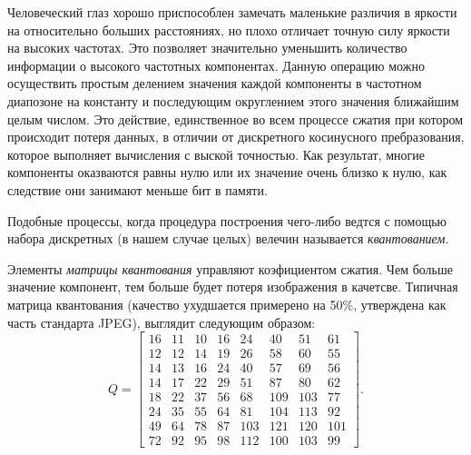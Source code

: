 \documentclass{matmex-diploma-custom}
\begin{document}
Человеческий глаз  хорошо приспособлен замечать маленькие различия в яркости на относительно больших расстояниях, но плохо отличает точную силу яркости на высоких частотах. Это позволяет значительно уменьшить количество информации о высокого частотных компонентах. Данную операцию можно  осуществить простым делением значения  каждой компоненты в частотном диапозоне на константу и последующим округлением этого значения ближайшим целым числом. Это действие, единственное во всем процессе сжатия при котором происходит потеря данных, в отличии от дискретного косинусного пребразования, которое выполняет вычисления с выской точностью. Как результат, многие компоненты оказваются равны  нулю или их значение очень близко к нулю, как следствие они занимают меньше бит в памяти.

Подобные процессы, когда процедура построения чего-либо ведтся с помощью набора дискретных (в нашем случае целых) велечин называется \emph{квантованием}.

Элементы \emph{матрицы квантования} управляют коэфициентом сжатия. Чем больше значение компонент, тем больше будет потеря изображения в качетсве. Типичная матрица квантования (качество ухудшается примерено на 50\%, утверждена как часть стандарта JPEG), выглядит следующим образом:
$$ Q=
     \begin{bmatrix}
      16 & 11 & 10 & 16 & 24 & 40 & 51 & 61 \\
      12 & 12 & 14 & 19 & 26 & 58 & 60 & 55 \\
      14 & 13 & 16 & 24 & 40 & 57 & 69 & 56 \\
      14 & 17 & 22 & 29 & 51 & 87 & 80 & 62 \\
      18 & 22 & 37 & 56 & 68 & 109 & 103 & 77 \\
      24 & 35 & 55 & 64 & 81 & 104 & 113 & 92 \\
      49 & 64 & 78 & 87 & 103 & 121 & 120 & 101 \\
      72 & 92 & 95 & 98 & 112 & 100 & 103 & 99
     \end{bmatrix}.
$$
\end{document}
